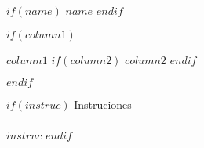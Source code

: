 \documentclass{article}
\begin{document}
$if(name)$
  {\noindent \huge $name$}
  \vspace{1cm}
$endif$

$if(column1)$
  \begin{multicols}{2}
  \noindent \color{light} $column1$
  \columnbreak
  $if(column2)$
    \noindent \color{light} $column2$
  $endif$
  \end{multicols}
  \vspace{1cm}
$endif$

$if(instruc)$
  {\noindent \LARGE Instruciones}\\
  \\
  \noindent \color{light} $instruc$
$endif$
\end{document}
